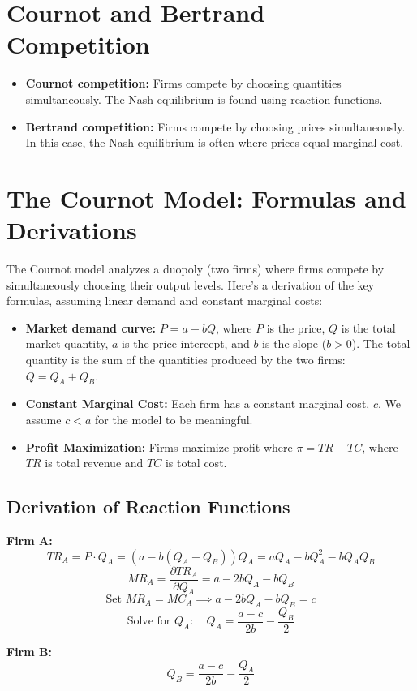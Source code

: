 \section*{Cournot and Bertrand Competition}
\begin{itemize}
    \item \textbf{Cournot competition:} Firms compete by choosing quantities simultaneously. The Nash equilibrium is found using reaction functions.
    \item \textbf{Bertrand competition:} Firms compete by choosing prices simultaneously. In this case, the Nash equilibrium is often where prices equal marginal cost.
\end{itemize}

\section*{The Cournot Model: Formulas and Derivations}
The Cournot model analyzes a duopoly (two firms) where firms compete by simultaneously choosing their output levels. Here’s a derivation of the key formulas, assuming linear demand and constant marginal costs:
\begin{itemize}
    \item \textbf{Market demand curve:} \(P = a - bQ\), where \(P\) is the price, \(Q\) is the total market quantity, \(a\) is the price intercept, and \(b\) is the slope (\(b > 0\)). The total quantity is the sum of the quantities produced by the two firms: \(Q = Q_A + Q_B\).
    \item \textbf{Constant Marginal Cost:} Each firm has a constant marginal cost, \(c\). We assume \(c < a\) for the model to be meaningful.
    \item \textbf{Profit Maximization:} Firms maximize profit where \(\pi = TR - TC\), where \(TR\) is total revenue and \(TC\) is total cost.
\end{itemize}

\subsection*{Derivation of Reaction Functions}
\textbf{Firm A:}
\[
TR_A = P \cdot Q_A = (a - b(Q_A + Q_B))Q_A = aQ_A - bQ_A^2 - bQ_AQ_B
\]
\[
MR_A = \frac{\partial TR_A}{\partial Q_A} = a - 2bQ_A - bQ_B
\]
\[
\text{Set } MR_A = MC_A \implies a - 2bQ_A - bQ_B = c
\]
\[
\text{Solve for } Q_A: \quad Q_A = \frac{a - c}{2b} - \frac{Q_B}{2}
\]

\textbf{Firm B:}
\[
Q_B = \frac{a - c}{2b} - \frac{Q_A}{2}
\]

